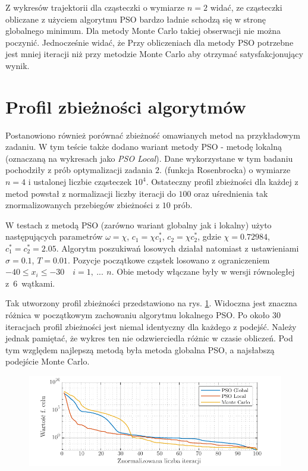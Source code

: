 \documentclass[11pt, a4paper, oneside]{article}
\begin{document}
Z wykresów trajektorii dla cząsteczki o wymiarze $n=2$ widać, ze cząsteczki obliczane z użyciem algorytmu PSO bardzo ładnie schodzą się w stronę globalnego minimum. Dla metody Monte Carlo takiej obserwacji nie można poczynić. Jednocześnie widać, że Przy obliczeniach dla metody PSO potrzebne jest mniej iteracji niż przy metodzie Monte Carlo aby otrzymać satysfakcjonujący wynik.

\section{Profil zbieżności algorytmów}

Postanowiono również porównać zbieżność omawianych metod na przykładowym zadaniu. W tym teście także dodano wariant metody PSO - metodę lokalną (oznaczaną na wykresach jako \textit{PSO Local}). Dane wykorzystane w tym badaniu pochodziły z prób optymalizacji zadania $2.$ (funkcja Rosenbrocka) o wymiarze $n = 4$ i ustalonej liczbie cząsteczek $10^{4}$. Ostateczny profil zbieżności dla każdej z metod powstał z normalizacji liczby iteracji do $100$ oraz uśrednienia tak znormalizowanych przebiegów zbieżności z $10$ prób.

W testach z metodą PSO (zarówno wariant globalny jak i lokalny) użyto następujących parametrów $\omega = \chi$, $c_1 = \chi c_1^*$, $c_2 = \chi c_2^*$, gdzie $\chi = 0.72984$, $c_1^* = c_2^* = 2.05$. Algorytm poszukiwań losowych działał natomiast z ustawieniami $\sigma = 0.1$, $T = 0.01$. Pozycje początkowe cząstek losowano z ograniczeniem $-40 \leq x_i \leq -30 \quad i = 1, \ ...\, \ n$. Obie metody włączane były w wersji równoległej z~$6$~wątkami.

Tak utworzony profil zbieżności przedstawiono na rys. \ref{fig:zbieznosc}. Widoczna jest znaczna różnica w początkowym zachowaniu algorytmu lokalnego PSO. Po około $30$ iteracjach profil zbieżności jest niemal identyczny dla każdego z podejść. Należy jednak pamiętać, że wykres ten nie odzwierciedla różnic w czasie obliczeń. Pod tym względem najlepszą metodą była metoda globalna PSO, a najsłabszą podejście Monte Carlo.

\begin{figure}[h]
\centerline{\includegraphics[width=\dimexpr.9\textwidth-1em]{grafiki/zbieznosc_porownanie.pdf}}
\label{fig:zbieznosc}
\end{figure}
\end{document}
